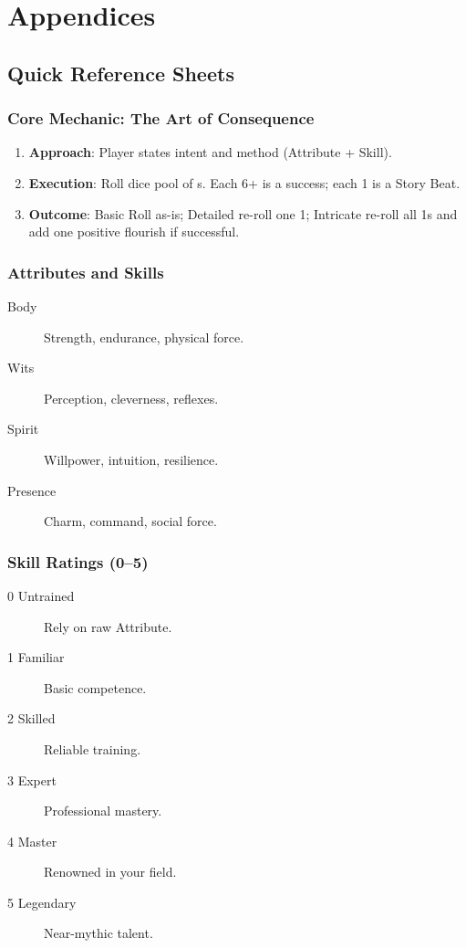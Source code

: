 \chapter{Appendices}

\section{Quick Reference Sheets}

\subsection{Core Mechanic: The Art of Consequence}

\begin{enumerate}
\item \textbf{Approach}: Player states intent and method (Attribute + Skill).
\item \textbf{Execution}: Roll dice pool of s. Each 6+ is a success; each 1 is a Story Beat.
\item \textbf{Outcome}: Basic Roll as-is; Detailed re-roll one 1; Intricate re-roll all 1s and add one positive flourish if successful.
\end{enumerate}

\subsection{Attributes and Skills}

\begin{description}
\item[Body] Strength, endurance, physical force.
\item[Wits] Perception, cleverness, reflexes.
\item[Spirit] Willpower, intuition, resilience.
\item[Presence] Charm, command, social force.
\end{description}

\subsection{Skill Ratings (0--5)}

\begin{description}
\item[0 Untrained] Rely on raw Attribute.
\item[1 Familiar] Basic competence.
\item[2 Skilled] Reliable training.
\item[3 Expert] Professional mastery.
\item[4 Master] Renowned in your field.
\item[5 Legendary] Near-mythic talent.
\end{description}

